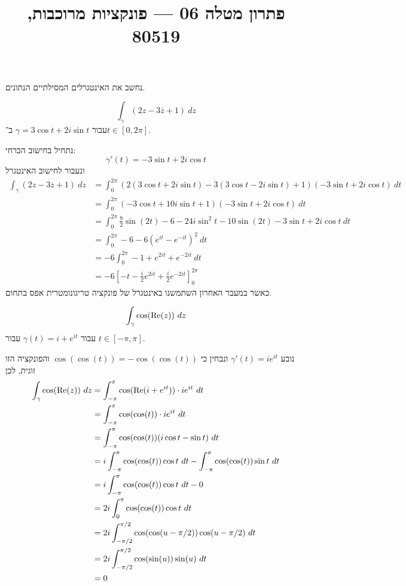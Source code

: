 
\title{פתרון מטלה 06 --- פונקציות מרוכבות, 80519}


\maketitle
\maketitleprint{}

\question{}
נחשב את האינטגרלים המסילתיים הנתונים.

\subquestion{}
\[
	\int_\gamma (2z - 3\overline{z} + 1)\ dz
\]
עבור $\gamma = 3 \cos t + 2i \sin t$ ב־$t \in [0, 2\pi]$.
\begin{solution}
	נתחיל בחישוב הכרחי:
	\[
		\gamma'(t) = -3 \sin t + 2i \cos t
	\]
	ונעבור לחישוב האינטגרל
	\begin{align*}
		\int_\gamma (2z - 3\overline{z} + 1)\ dz
		& = \int_0^{2\pi} (2(3 \cos t + 2i \sin t) - 3(3 \cos t - 2i \sin t) + 1)(-3 \sin t + 2i \cos t)\ dt \\
		& = \int_0^{2\pi} (-3 \cos t + 10i \sin t + 1)(-3 \sin t + 2i \cos t)\ dt \\
		& = \int_0^{2\pi} \frac{9}{2} \sin(2t) - 6 - 24i \sin^2 t - 10 \sin(2t) - 3 \sin t + 2i \cos t\ dt \\
		& = \int_0^{2\pi} - 6 - 6 {(e^{it} - e^{-it})}^2\ dt \\
		& = -6 \int_0^{2\pi} -1 + e^{2it} + e^{-2it}\ dt \\
		& = -6 {\left[ -t - \frac{i}{2} e^{2it} + \frac{i}{2} e^{-2it}\right]}_0^{2\pi}
	\end{align*}
	כאשר במעבר האחרון השתמשנו באינטגרל של פונקציה טריגונומטרית אפס בתחום.
\end{solution}

\subquestion{}
\[
	\int_\gamma \cos(\operatorname{Re}(z))\ dz
\]
עבור $\gamma(t) = i + e^{it}$ עבור $t \in [-\pi, \pi]$.
\begin{solution}
	נובע $\gamma'(t) = i e^{it}$ ונבחין כי $\cos(\cos(t)) = -\cos(\cos(t))$ והפונקציה הזו זוגית, לכן
	\begin{align*}
		\int_\gamma \cos(\re(z))\ dz
		& = \int_{-\pi}^{\pi} \cos(\re(i + e^{it})) \cdot i e^{it}\ dt \\
		& = \int_{-\pi}^{\pi} \cos(\cos(t)) \cdot i e^{it}\ dt \\
		& = \int_{-\pi}^{\pi} \cos(\cos(t)) (i \cos t - \sin t)\ dt \\
		& = i \int_{-\pi}^{\pi} \cos(\cos(t)) \cos t\ dt - \int_{-\pi}^{\pi} \cos(\cos(t)) \sin t\ dt \\
		& = i \int_{-\pi}^{\pi} \cos(\cos(t)) \cos t\ dt - 0 \\
		& = 2i \int_{0}^{\pi} \cos(\cos(t)) \cos t\ dt \\
		& = 2i \int_{-\pi/2}^{\pi/2} \cos(\cos(u - \pi/2)) \cos(u - \pi/2)\ dt \\
		& = 2i \int_{-\pi/2}^{\pi/2} \cos(\sin(u)) \sin(u)\ dt \\
		& = 0
	\end{align*}
\end{solution}

